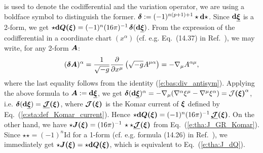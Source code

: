 \begin{example}
{is used to denote the codifferential and the variation operator,
we are using a boldface symbol to distinguish the former.}
$\bm{\delta} := (-1)^{n(p+1)+1} \star\mathbf{d}\star$. Since $\mathbf{d} \underline{\bm{\xi}}$ is a 2-form, we get
$\star\mathbf{d}\bm{Q}\textbf{(}\bm{\xi}\textbf{)} = (-1)^n (16\pi)^{-1}\, \bm{\delta}(\mathbf{d} \underline{\bm{\xi}})$. From the expression of the
codifferential in a coordinate chart $(x^\alpha)$ (cf. e.g. Eq.~(14.37) in Ref.~\cite{Strau13}), we may
write, for any 2-form $\bm{A}$:
\[
        (\bm{\delta}\bm{A})^\alpha = \frac{1}{\sqrt{-g}} \frac{\partial }{\partial x^\mu} \left(\sqrt{-g} A^{\mu\alpha} \right)
            = - \nabla_\mu A^{\alpha\mu} ,
\]
where the last equality follows from the identity (\ref{e:bas:div_antisym}).
Applying the above formula to $\bm{A} := \mathbf{d}\underline{\bm{\xi}}$,  we get
$\bm{\delta}(\mathbf{d}\underline{\bm{\xi}})^\alpha = - \nabla_\mu (\nabla^\alpha \xi^\mu - \nabla^\mu \xi^\alpha) = \mathcal{J}\textbf{(}\bm{\xi}\textbf{)}^\alpha$, i.e. $\bm{\delta}(\mathbf{d}\underline{\bm{\xi}}) = \underline{\bm{\mathcal{J}}}\textbf{(}\bm{\xi}\textbf{)}$,
where $\bm{\mathcal{J}}\textbf{(}\bm{\xi}\textbf{)}$ is the Komar current of $\bm{\xi}$
defined by Eq.~(\ref{e:sta:def_Komar_current}).
Hence $\star\mathbf{d}\bm{Q}\textbf{(}\bm{\xi}\textbf{)} = (-1)^n (16\pi)^{-1}\, \underline{\bm{\mathcal{J}}}\textbf{(}\bm{\xi}\textbf{)}$. On the other hand, we have
$\star \bm{J}\textbf{(}\bm{\xi}\textbf{)} =(16\pi)^{-1}\, \star \star\underline{\bm{\mathcal{J}}}\textbf{(}\bm{\xi}\textbf{)}$ from
Eq.~(\ref{e:tha:J_GR_Komar}). Since $\star\star = (-1)^n \mathrm{Id}$ for a 1-form
(cf. e.g. formula (14.26) in Ref.~\cite{Strau13}), we immediately get
$\star \bm{J}\textbf{(}\bm{\xi}\textbf{)}  = \star\mathbf{d}\bm{Q}\textbf{(}\bm{\xi}\textbf{)}$, which is equivalent to
Eq.~(\ref{e:tha:J_dQ}).
\end{example}


